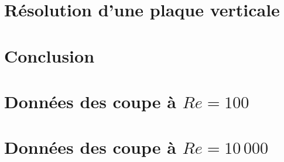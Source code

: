 \documentclass[12pt, letterpaper]{article}
\begin{document}
\section{Résolution d'une plaque verticale}
		

\section{Conclusion}
	
	
\newpage

\appendix

\section{Données des coupe à $Re=100$}
	
\section{Données des coupe à $Re=10\,000$}
	
\end{document}
